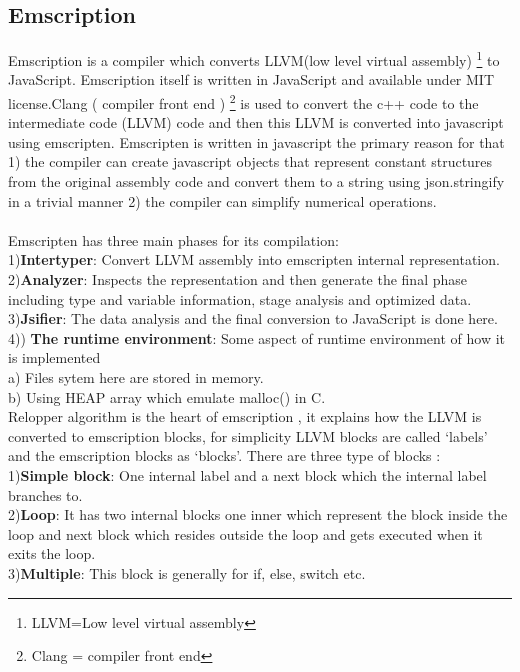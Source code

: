 \documentclass[23pt]{article}
\begin{document}
\subsection{Emscription}
{\Large Emscription is a compiler which converts LLVM(low level virtual assembly) \footnote{LLVM=Low level virtual assembly} to JavaScript. Emscription itself is written in JavaScript and available under MIT license.Clang ( compiler front end ) \footnote{Clang = compiler front end} is used to convert the c++ code to the intermediate code (LLVM) code and then this LLVM is converted into javascript using emscripten. Emscripten is written in javascript the primary reason for that 1) the compiler can create javascript objects that represent constant structures from the original assembly code and convert them to a string using json.stringify in a trivial manner 2) the compiler can simplify numerical operations. \\ \\
Emscripten has three main phases for its compilation: \\ 
1)\textbf{Intertyper}: Convert LLVM assembly into emscripten internal representation. \\ 
2)\textbf{Analyzer}: Inspects the representation and then generate the final phase including type and variable information, stage analysis and optimized data. \\ 
3)\textbf{Jsifier}: The data analysis and the final conversion to JavaScript is done here. \\ 
4))\textbf{ The runtime environment}: Some aspect of runtime environment of how it is implemented \\
 a) Files sytem here are stored in memory.\\
 b) Using HEAP array which emulate malloc() in C.\\
Relopper algorithm is the heart of emscription , it explains how the LLVM is converted to emscription blocks, for simplicity LLVM blocks are called ‘labels’ and the emscription blocks as ‘blocks’. There are three type of blocks : \\
1)\textbf{Simple block}: One internal label and a next block which the internal label branches to.\\
2)\textbf{Loop}: It has two internal blocks one inner which represent the block inside the loop and next block which resides outside the loop and gets executed when it exits the loop. \\
3)\textbf{Multiple}: This block is generally for if, else, switch etc.\\ 
}
\end{document}
